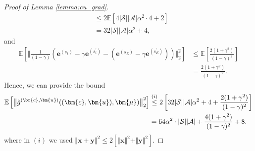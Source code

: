 \documentclass[10pt]{article} %
\def\Ac{\ensuremath{\mathcal{A}}}
\def\vc{{\bm{c}}}
\def\ve{{\bm{e}}}
\def\vu{{\bm{u}}}
\def\vx{{\bm{x}}}
\def\vy{{\bm{y}}}
\def\vmu{{\bm{\mu}}}
\newcommand{\E}{\mathbb{E}}
\newcommand{\St}{\mathcal{S}}
\begin{document}
\begin{proof}[Proof of Lemma \ref{lemma:cu_grad}]
\begin{align*}
            &\leq 2\E\left[4|\St||\Ac|\alpha^2\cdot4 + 2\right]\\
            &= 32|\St||\Ac|\alpha^2 + 4,
        \end{align*}
        and 
        \begin{align*}
            \E\left[\Big\Vert \frac{1}{(1-\gamma)}\left( \ve^{(s_t)} - \gamma \ve^{(s_t^\prime)} - (\ve^{(s_E)} - \gamma\ve^{(s_E^\prime)})\right) \Big\Vert_2^2\right] &\leq \E\left[\frac{2(1+\gamma^2)}{(1-\gamma)^2}\right]\\
            &= \frac{2(1+\gamma^2)}{(1-\gamma)^2}.
        \end{align*}
        Hence, we can provide the bound
        \begin{align*}
            \E\left[ \big\Vert \Tilde{g}^{(\vc,\vu)}((\vc,\vu),\vmu) \big\Vert^2_2 \right]
            &\stackrel{(i)}{\leq} 2\left[ 32|\St||\Ac|\alpha^2 + 4 + \frac{2(1+\gamma^2)}{(1-\gamma)^2}\right] \\
            &= 64\alpha^2\cdot |\St||\Ac| + \frac{4(1+\gamma^2)}{(1-\gamma)^2} + 8.
        \end{align*}
        where in $(i)$ we used $\Vert \vx+ \vy\Vert^2 \leq 2[\Vert \vx \Vert^2 + \Vert \vy \Vert^2]$.
     \end{proof}
\end{document}
